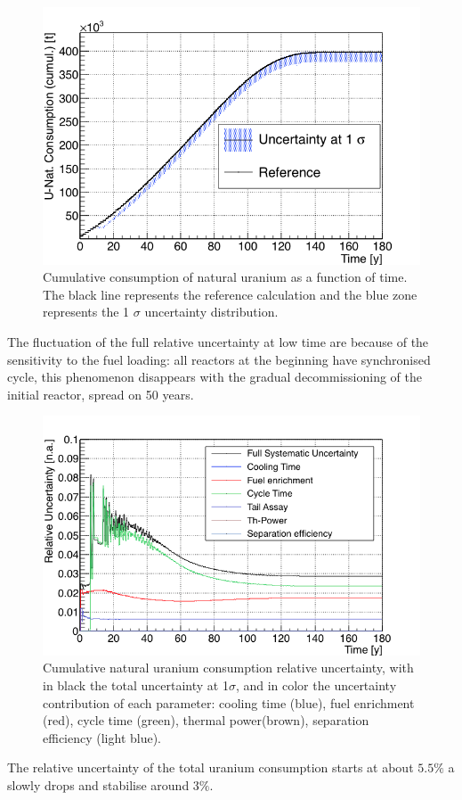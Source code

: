 \documentclass{anstrans}
\begin{document}
\begin{figure}[ht] %
    \centering
    \includegraphics[scale=0.35]{unat_full}
    \caption{Cumulative consumption of natural uranium as a function of time. The black line
        represents the reference calculation and the blue zone
        represents the 1 $\sigma$ uncertainty distribution.}\label{fig:unat_full}
\end{figure}


The fluctuation of the full relative uncertainty at low time are because of the
sensitivity to the fuel loading: all reactors at the beginning have synchronised
cycle, this phenomenon disappears with the gradual decommissioning of the initial
reactor, spread on 50 years.


\begin{figure}[h!!] %
    \centering
    \includegraphics[scale=0.35]{unat_uncer}
    \caption{Cumulative natural uranium consumption relative uncertainty, with
    in black the total uncertainty at 1$\sigma$, and in color the uncertainty
    contribution of each parameter: cooling time (blue), fuel enrichment (red),
    cycle time (green), thermal power(brown), separation efficiency (light
    blue).}\label{fig:unatr_uncer}
\end{figure}
The relative uncertainty of the total uranium consumption starts at about
$5.5\%$ a slowly drops and stabilise around $3\%$.
\end{document}
